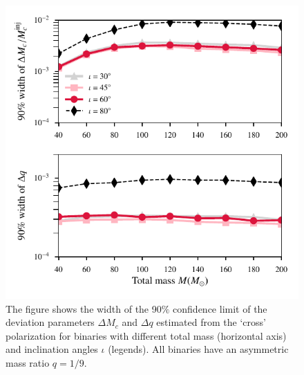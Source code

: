 \documentclass[prd,preprintnumbers,twocolumn,eqsecnum,floatfix,a4paper,nofootinbib,superscriptaddress]{revtex4}
\begin{document}
\begin{figure}[h]
	\begin{center}
		\includegraphics[scale=0.78]{figs/hp_hc_consistency_confidence_interval_varying_M.pdf}
	\end{center} 
	\caption{The figure shows the width of the 90$\%$ confidence limit of the deviation parameters $\Delta M_c$ and $\Delta q$ estimated from the `cross' polarization for binaries with different total mass (horizontal axis) and inclination angles $\iota$ (legends). All binaries have an asymmetric mass ratio $q=1/9$.}
	\label{fig:hp_hc_90_CI_diffM}
\end{figure}
\end{document}
